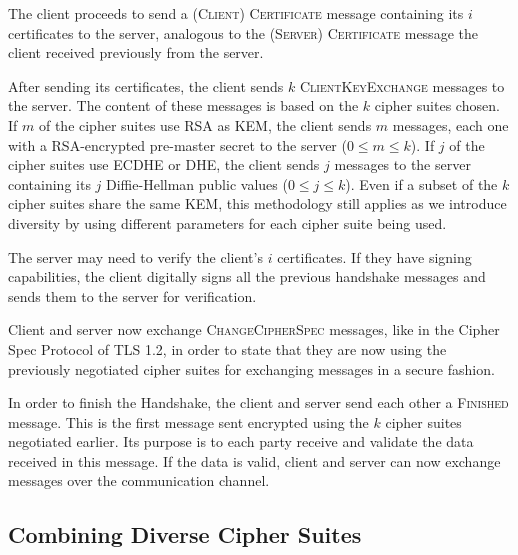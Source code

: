 \documentclass{sig-alternate-05-2015}
\newcommand{\msg}[1]{\textsc{{#1}}}
\begin{document}
The client proceeds to send a \msg{(Client) Certificate} message containing its $i$ certificates to the server, analogous to the \msg{(Server) Certificate} message the client received previously from the server.

After sending its certificates, the client sends $k$ \msg{ClientKeyExchange} messages to the server. The content of these messages is based on the $k$ cipher suites chosen. If $m$ of the cipher suites use RSA as KEM, the client sends $m$ messages, each one with a RSA-encrypted pre-master secret to the server ($0 \leq m \leq k$). If $j$ of the cipher suites use ECDHE or DHE, the client sends $j$ messages to the server containing its $j$ Diffie-Hellman public values ($0 \leq j \leq k$). Even if a subset of the $k$ cipher suites share the same KEM, this methodology still applies as we introduce diversity by using different parameters for each cipher suite being used.

The server may need to verify the client's $i$ certificates. If they have signing capabilities, the client digitally signs all the previous handshake messages and sends them to the server for verification.

Client and server now exchange \msg{ChangeCipherSpec} messages, like in the Cipher Spec Protocol of TLS 1.2, in order to state that they are now using the previously negotiated cipher suites for exchanging messages in a secure fashion.

In order to finish the Handshake, the client and server send each other a \msg{Finished} message. This is the first message sent encrypted using the $k$ cipher suites negotiated earlier. Its purpose is to each party receive and validate the data received in this message. If the data is valid, client and server can now exchange messages over the communication channel.

\subsection{Combining Diverse Cipher Suites}
\end{document}
